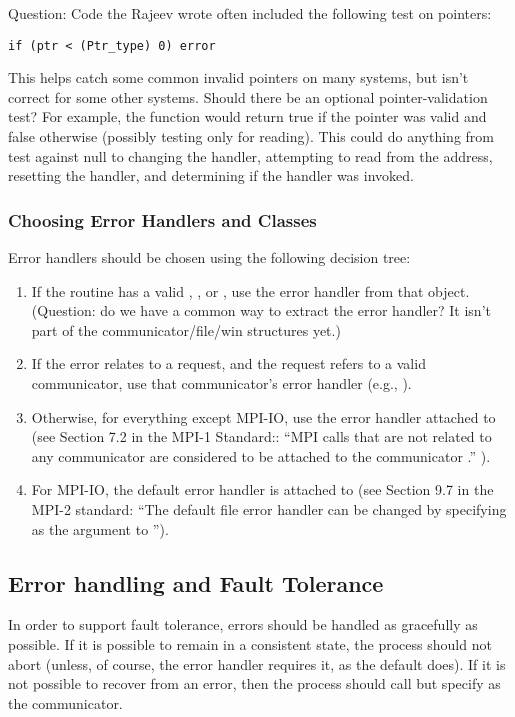 \documentclass{article}
\begin{document}
Question: Code the Rajeev wrote often included the following test on pointers:
\begin{verbatim}
if (ptr < (Ptr_type) 0) error
\end{verbatim}
This helps catch some common invalid pointers on many systems, but isn't
correct for some other systems.  Should there be an optional
pointer-validation test?  For example, the function
 would return true if the pointer was valid and
false otherwise (possibly testing only for reading).  This could do anything
from test against null to changing the  handler, attempting to
read from the address, resetting the handler, and determining if the handler
was invoked.  

\subsubsection{Choosing Error Handlers and Classes}
Error handlers should be chosen using the following decision tree:
\begin{enumerate}
\item If the routine has a valid , , or
  , use the error handler from that object.  (Question: do we
  have a common way to extract the error handler?  It isn't part of the
  communicator/file/win structures yet.)
\item If the error relates to a request, and the request refers to a valid
  communicator, use that communicator's error handler (e.g., ).
\item Otherwise, for everything except MPI-IO, use the error handler attached
  to   
  (see Section 7.2 in the MPI-1 Standard:: ``MPI calls that are not related to
  any communicator are considered to be attached to the communicator
  .'' ).
\item For MPI-IO, the default error handler is attached to
   (see Section 9.7 in the MPI-2 standard: ``The default
  file error handler can be changed by specifying  as the
   argument to ''). 
\end{enumerate}

\subsection{Error handling and Fault Tolerance}
In order to support fault tolerance, errors should be handled as
gracefully as possible.  If it is possible to remain in a consistent
state, the process should not abort (unless, of course, the error
handler requires it, as the default  does).  
If it is not possible to recover from an error, then the process
should call  but specify  as the
communicator.  
\end{document}
